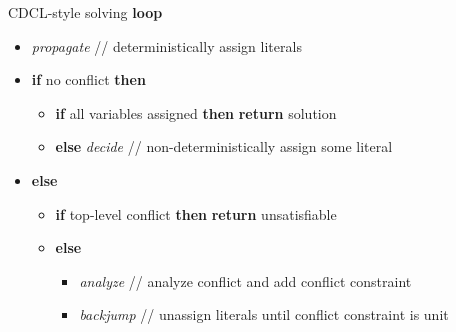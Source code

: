 \begin{frame}{CDCL-style solving}
  \bigskip
  \bigskip
  \textbf{loop}
  \begin{itemize}
  \item [] \textit{propagate}      \hfill// deterministically assign literals
  \item [] \textbf{if} no conflict \textbf{then}
    \begin{itemize}
    \item [] \textbf{if} all variables assigned
      \textbf{then}
      \textbf{return} solution
    \item [] \textbf{else}
      \textit{decide}
      \hfill// non-deterministically assign some literal
    \end{itemize}
  \item [] \textbf{else}
    \begin{itemize}
    \item [] \textbf{if} top-level conflict
      \textbf{then}
      \textbf{return} unsatisfiable
    \item [] \textbf{else}
      \begin{itemize}
      \item [] \textit{analyze} \hfill// analyze conflict and add conflict constraint
      \item [] \textit{backjump} \hfill// unassign literals until conflict constraint is unit
      \end{itemize}
    \end{itemize}
  \end{itemize}
\end{frame}
%
